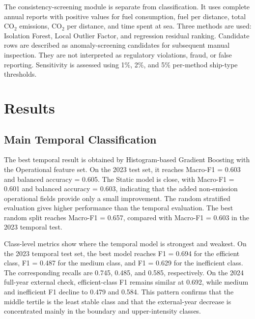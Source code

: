 \documentclass[preprints,article,submit,pdftex,oneauthor]{Definitions/mdpi}
\begin{document}
The consistency-screening module is separate from classification. It uses complete annual reports with positive values for fuel consumption, fuel per distance, total CO$_2$ emissions, CO$_2$ per distance, and time spent at sea. Three methods are used: Isolation Forest, Local Outlier Factor, and regression residual ranking. Candidate rows are described as anomaly-screening candidates for subsequent manual inspection. They are not interpreted as regulatory violations, fraud, or false reporting. Sensitivity is assessed using 1\%, 2\%, and 5\% per-method ship-type thresholds.

\section{Results}

\subsection{Main Temporal Classification}

The best temporal result is obtained by Histogram-based Gradient Boosting with the Operational feature set. On the 2023 test set, it reaches Macro-F1 = 0.603 and balanced accuracy = 0.605. The Static model is close, with Macro-F1 = 0.601 and balanced accuracy = 0.603, indicating that the added non-emission operational fields provide only a small improvement. The random stratified evaluation gives higher performance than the temporal evaluation. The best random split reaches Macro-F1 = 0.657, compared with Macro-F1 = 0.603 in the 2023 temporal test.

Class-level metrics show where the temporal model is strongest and weakest. On the 2023 temporal test set, the best model reaches F1 = 0.694 for the efficient class, F1 = 0.487 for the medium class, and F1 = 0.629 for the inefficient class. The corresponding recalls are 0.745, 0.485, and 0.585, respectively. On the 2024 full-year external check, efficient-class F1 remains similar at 0.692, while medium and inefficient F1 decline to 0.479 and 0.584. This pattern confirms that the middle tertile is the least stable class and that the external-year decrease is concentrated mainly in the boundary and upper-intensity classes.
\end{document}
